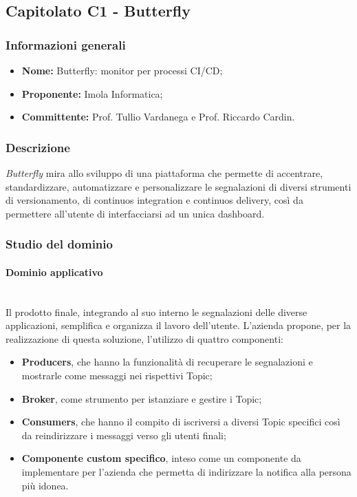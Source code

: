\subsection{Capitolato C1 - Butterfly}
\subsubsection{Informazioni generali}
\begin{itemize}
\item
\textbf{Nome:} Butterfly: monitor per processi CI/CD;
\item
\textbf{Proponente:} Imola Informatica;
\item
\textbf{Committente:} Prof. Tullio Vardanega e Prof. Riccardo Cardin.
\end{itemize}
\subsubsection{Descrizione}
\textit{Butterfly} mira allo sviluppo di una piattaforma che permette di accentrare, standardizzare, automatizzare e personalizzare le segnalazioni di diversi strumenti di versionamento, di continuos integration e continuos delivery, così da permettere all'utente di interfacciarsi ad un unica dashboard.
\subsubsection{Studio del dominio}
\paragraph{Dominio applicativo}\mbox{}\\
Il prodotto finale, integrando al suo interno le segnalazioni delle diverse applicazioni, semplifica e organizza il lavoro dell'utente. L'azienda propone, per la realizzazione di questa soluzione, l'utilizzo di quattro componenti:
\begin{itemize}
	\item \textbf{Producers}, che hanno la funzionalità di recuperare le segnalazioni e mostrarle come messaggi nei rispettivi Topic;
	\item \textbf{Broker}, come strumento per istanziare e gestire i Topic;
	\item \textbf{Consumers}, che hanno il compito di iscriversi a diversi Topic specifici così da reindirizzare i messaggi verso gli utenti finali;
    \item \textbf{Componente custom specifico}, inteso come un componente da implementare per l'azienda che permetta di indirizzare la notifica alla persona più idonea.
\end{itemize}
